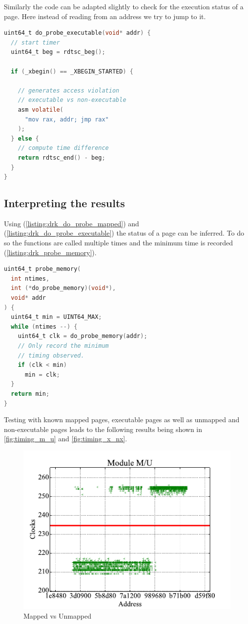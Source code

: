 Similarly the code can be adapted slightly to check for the execution status of a page.
Here instead of reading from an address we try to jump to it.

\begin{lstlisting}[language=C, label=listing:drk_do_probe_executable, caption={Executable vs Non-Executable timing test{\cite[Figure~3]{drk}}}]
uint64_t do_probe_executable(void* addr) {
  // start timer
  uint64_t beg = rdtsc_beg();

  if (_xbegin() == _XBEGIN_STARTED) {

    // generates access violation
    // executable vs non-executable
    asm volatile(
      "mov rax, addr; jmp rax"
    );
  } else {
    // compute time difference
    return rdtsc_end() - beg;
  }
}
\end{lstlisting}

\subsection{Interpreting the results}

Using  (\autoref{listing:drk_do_probe_mapped}) and  (\autoref{listing:drk_do_probe_executable}) the status of a page can be inferred.
To do so the functions are called multiple times and the minimum time is recorded (\autoref{listing:drk_probe_memory}).

\begin{lstlisting}[language=C, caption={Collect timing results{\cite[Figure~3]{drk}}}, label=listing:drk_probe_memory]
uint64_t probe_memory(
  int ntimes,
  int (*do_probe_memory)(void*),
  void* addr
) {
  uint64_t min = UINT64_MAX;
  while (ntimes --) {
    uint64_t clk = do_probe_memory(addr);
    // Only record the minimum
    // timing observed.
    if (clk < min)
      min = clk;
  }
  return min;
}
\end{lstlisting}

Testing with known mapped pages, executable pages as well as unmapped and non-executable pages leads to the following results being shown in \autoref{fig:timing_m_u} and \autoref{fig:timing_x_nx}.

\begin{figure}[h]
  \begin{center}
    \includegraphics[page=1,width=.4\textwidth]{fig/prebuilt_results_M_U}
  \end{center}
  \caption{Mapped vs Unmapped \cite[Figure~6]{drk}}
  \label{fig:timing_m_u}
\end{figure}

